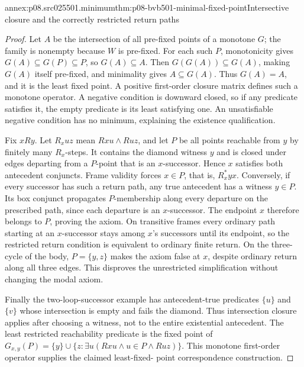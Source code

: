 \begin{annexitem}{annex:p08.src025501.minimum}{thm:p08-bvb501-minimal-fixed-point}{Intersective closure and the correctly restricted return paths}
\begin{proof}
Let \(A\) be the intersection of all pre-fixed points of a monotone
\(G\); the family is nonempty because \(W\) is pre-fixed.
For each such \(P\), monotonicity gives
\(G(A)\subseteq G(P)\subseteq P\), so \(G(A)\subseteq A\).
Then \(G(G(A))\subseteq G(A)\), making \(G(A)\) itself
pre-fixed, and minimality gives \(A\subseteq G(A)\).
Thus \(G(A)=A\), and it is the least fixed point. A positive
first-order closure matrix defines such a monotone operator. A negative
condition is downward closed, so if any predicate satisfies it, the
empty predicate is its least satisfying one. An unsatisfiable negative
condition has no minimum, explaining the existence qualification.

Fix \(xRy\). Let \(R_xuz\) mean \(Rxu\land Ruz\), and
let \(P\) be all points reachable from \(y\) by finitely many
\(R_x\)-steps. It contains the diamond witness \(y\) and is
closed under edges departing from a \(P\)-point that is an
\(x\)-successor. Hence \(x\) satisfies both antecedent conjuncts.
Frame validity forces \(x\in P\), that is, \(R_x^*yx\).
Conversely, if every successor has such a return path, any true
antecedent has a witness \(y\in P\). Its box conjunct propagates
\(P\)-membership along every departure on the prescribed path,
since each departure is an \(x\)-successor. The endpoint \(x\)
therefore belongs to \(P\), proving the axiom. On transitive frames
every ordinary path starting at an \(x\)-successor stays among
\(x\)'s successors until its endpoint, so the restricted return
condition is equivalent to ordinary finite return. On the three-cycle
of the body, \(P=\{y,z\}\) makes the axiom false at \(x\),
despite ordinary return along all three edges. This disproves the
unrestricted simplification without changing the modal axiom.

Finally the two-loop-successor example has antecedent-true predicates
\(\{u\}\) and \(\{v\}\) whose intersection is empty and
fails the diamond. Thus intersection closure applies after choosing
a witness, not to the entire existential antecedent. The least
restricted reachability predicate is the fixed point of
\(G_{x,y}(P)=\{y\}\cup\{z:\exists u(Rxu\land u\in P\land Ruz)\}\).
This monotone first-order operator supplies the claimed least-fixed-
point correspondence construction.
\end{proof}
\end{annexitem}

